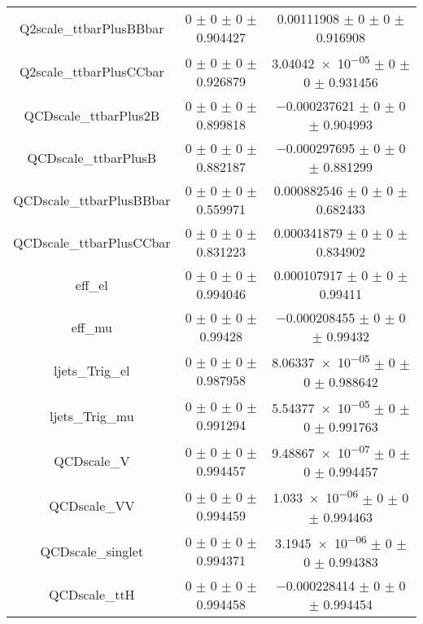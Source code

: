 \begin{table}
\begin{tabular}{ccc}
Q2scale\_ttbarPlusBBbar & \num{0} $\pm$ \num{0} $\pm$ \num{0} $\pm$ \num{0.904427} & \num{0.00111908} $\pm$ \num{0} $\pm$ \num{0} $\pm$ \num{0.916908}\\
Q2scale\_ttbarPlusCCbar & \num{0} $\pm$ \num{0} $\pm$ \num{0} $\pm$ \num{0.926879} & \num{3.04042e-05} $\pm$ \num{0} $\pm$ \num{0} $\pm$ \num{0.931456}\\
QCDscale\_ttbarPlus2B & \num{0} $\pm$ \num{0} $\pm$ \num{0} $\pm$ \num{0.899818} & \num{-0.000237621} $\pm$ \num{0} $\pm$ \num{0} $\pm$ \num{0.904993}\\
QCDscale\_ttbarPlusB & \num{0} $\pm$ \num{0} $\pm$ \num{0} $\pm$ \num{0.882187} & \num{-0.000297695} $\pm$ \num{0} $\pm$ \num{0} $\pm$ \num{0.881299}\\
QCDscale\_ttbarPlusBBbar & \num{0} $\pm$ \num{0} $\pm$ \num{0} $\pm$ \num{0.559971} & \num{0.000882546} $\pm$ \num{0} $\pm$ \num{0} $\pm$ \num{0.682433}\\
QCDscale\_ttbarPlusCCbar & \num{0} $\pm$ \num{0} $\pm$ \num{0} $\pm$ \num{0.831223} & \num{0.000341879} $\pm$ \num{0} $\pm$ \num{0} $\pm$ \num{0.834902}\\
eff\_el & \num{0} $\pm$ \num{0} $\pm$ \num{0} $\pm$ \num{0.994046} & \num{0.000107917} $\pm$ \num{0} $\pm$ \num{0} $\pm$ \num{0.99411}\\
eff\_mu & \num{0} $\pm$ \num{0} $\pm$ \num{0} $\pm$ \num{0.99428} & \num{-0.000208455} $\pm$ \num{0} $\pm$ \num{0} $\pm$ \num{0.99432}\\
ljets\_Trig\_el & \num{0} $\pm$ \num{0} $\pm$ \num{0} $\pm$ \num{0.987958} & \num{8.06337e-05} $\pm$ \num{0} $\pm$ \num{0} $\pm$ \num{0.988642}\\
ljets\_Trig\_mu & \num{0} $\pm$ \num{0} $\pm$ \num{0} $\pm$ \num{0.991294} & \num{5.54377e-05} $\pm$ \num{0} $\pm$ \num{0} $\pm$ \num{0.991763}\\
QCDscale\_V & \num{0} $\pm$ \num{0} $\pm$ \num{0} $\pm$ \num{0.994457} & \num{9.48867e-07} $\pm$ \num{0} $\pm$ \num{0} $\pm$ \num{0.994457}\\
QCDscale\_VV & \num{0} $\pm$ \num{0} $\pm$ \num{0} $\pm$ \num{0.994459} & \num{1.033e-06} $\pm$ \num{0} $\pm$ \num{0} $\pm$ \num{0.994463}\\
QCDscale\_singlet & \num{0} $\pm$ \num{0} $\pm$ \num{0} $\pm$ \num{0.994371} & \num{3.1945e-06} $\pm$ \num{0} $\pm$ \num{0} $\pm$ \num{0.994383}\\
QCDscale\_ttH & \num{0} $\pm$ \num{0} $\pm$ \num{0} $\pm$ \num{0.994458} & \num{-0.000228414} $\pm$ \num{0} $\pm$ \num{0} $\pm$ \num{0.994454}\\

\end{tabular}
\end{table}
